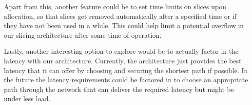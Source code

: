 Apart from this, another feature could be to set time limits on slices upon allocation, so that slices get removed automatically after a specified time or if they have not been used in a while. This could help limit a potential overflow in our slicing architecture after some time of operation.

Lastly, another interesting option to explore would be to actually factor in the latency with our architecture. Currently, the architecture just provides the best latency that it can offer by choosing and securing the shortest path if possible. In the future the latency requirements could be factored in to choose an appropriate path through the network that can deliver the required latency but might be under less load.